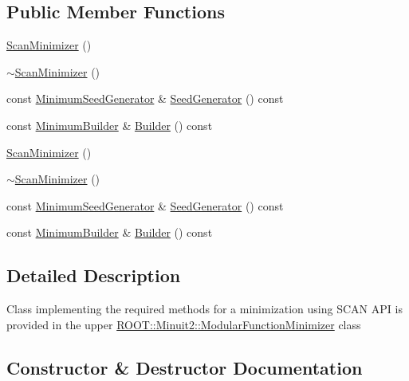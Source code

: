 \subsection*{Public Member Functions}
\begin{DoxyCompactItemize}
\item 
\mbox{\hyperlink{classROOT_1_1Minuit2_1_1ScanMinimizer_af77ed505a71c7a2ce4581adc38e6e025}{Scan\+Minimizer}} ()
\item 
\mbox{\hyperlink{classROOT_1_1Minuit2_1_1ScanMinimizer_a4c905e6b138573bf48d92cbcace158a7}{$\sim$\+Scan\+Minimizer}} ()
\item 
const \mbox{\hyperlink{classROOT_1_1Minuit2_1_1MinimumSeedGenerator}{Minimum\+Seed\+Generator}} \& \mbox{\hyperlink{classROOT_1_1Minuit2_1_1ScanMinimizer_aaad34811cf2862cd8b66b634a1c9ba07}{Seed\+Generator}} () const
\item 
const \mbox{\hyperlink{classROOT_1_1Minuit2_1_1MinimumBuilder}{Minimum\+Builder}} \& \mbox{\hyperlink{classROOT_1_1Minuit2_1_1ScanMinimizer_a6ca4b63ec20ed8dd310e02d427ef05fa}{Builder}} () const
\item 
\mbox{\hyperlink{classROOT_1_1Minuit2_1_1ScanMinimizer_af77ed505a71c7a2ce4581adc38e6e025}{Scan\+Minimizer}} ()
\item 
\mbox{\hyperlink{classROOT_1_1Minuit2_1_1ScanMinimizer_a4c905e6b138573bf48d92cbcace158a7}{$\sim$\+Scan\+Minimizer}} ()
\item 
const \mbox{\hyperlink{classROOT_1_1Minuit2_1_1MinimumSeedGenerator}{Minimum\+Seed\+Generator}} \& \mbox{\hyperlink{classROOT_1_1Minuit2_1_1ScanMinimizer_aaad34811cf2862cd8b66b634a1c9ba07}{Seed\+Generator}} () const
\item 
const \mbox{\hyperlink{classROOT_1_1Minuit2_1_1MinimumBuilder}{Minimum\+Builder}} \& \mbox{\hyperlink{classROOT_1_1Minuit2_1_1ScanMinimizer_a6ca4b63ec20ed8dd310e02d427ef05fa}{Builder}} () const
\end{DoxyCompactItemize}


\subsection{Detailed Description}
Class implementing the required methods for a minimization using S\+C\+AN A\+PI is provided in the upper \mbox{\hyperlink{classROOT_1_1Minuit2_1_1ModularFunctionMinimizer}{R\+O\+O\+T\+::\+Minuit2\+::\+Modular\+Function\+Minimizer}} class 

\subsection{Constructor \& Destructor Documentation}
\mbox{\label{classROOT_1_1Minuit2_1_1ScanMinimizer_af77ed505a71c7a2ce4581adc38e6e025}} 

